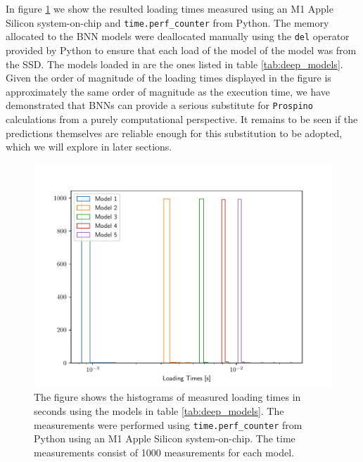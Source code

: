 In figure \ref{fig:loading_times} we show the resulted loading times measured using an M1 Apple Silicon system-on-chip and {\tt time.perf\_counter} from Python. The memory allocated to the BNN models were deallocated manually using the {\tt del} operator provided by Python to ensure that each load of the model of the model was from the SSD. The models loaded in are the ones listed in table \ref{tab:deep_models}. Given the order of magnitude of the loading times displayed in the figure is approximately the same order of magnitude as the execution time, we have demonstrated that BNNs can provide a serious substitute for {\tt Prospino} calculations from a purely computational perspective. It remains to be seen if the predictions themselves are reliable enough for this substitution to be adopted, which we will explore in later sections.

\begin{figure}[h!]
    \centering
    \includegraphics[scale=0.7]{figures/computational_cost/loading_times.pdf}
    \caption{
        The figure shows the histograms of measured loading times in seconds using the models in table \ref{tab:deep_models}. The measurements were performed using {\tt time.perf\_counter} from Python using an M1 Apple Silicon system-on-chip. The time measurements consist of 1000 measurements for each model.
    }
    \label{fig:loading_times}
\end{figure}



